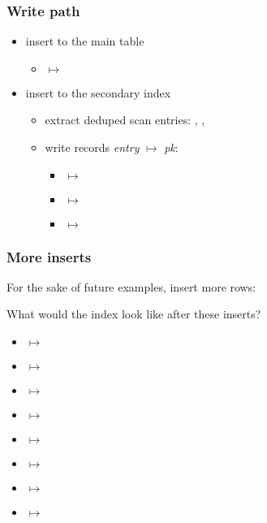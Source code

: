 \begin{frame}
  \frametitle{Write path}
  \pause

  \begin{itemize}
    \item insert to the main table
      \pause
      \begin{itemize}
        \item {} $\mapsto$ 
      \end{itemize}
      \pause
    \item insert to the secondary index
      \pause
      \begin{itemize}
        \item extract deduped scan entries: , ,
          \pause
        \item write records \emph{entry} $\mapsto$ \emph{pk}:
          \pause
          \begin{itemize}
            \item {} $\mapsto$ 
              \pause
            \item {} $\mapsto$ 
              \pause
            \item {} $\mapsto$ 
          \end{itemize}
      \end{itemize}
  \end{itemize}
\end{frame}

\begin{frame}
  \frametitle{More inserts}
  For the sake of future examples, insert more rows:

  \pause

  What would the index look like after these inserts?
  \pause

  \begin{itemize}
    \item {} $\mapsto$ 
    \item {} $\mapsto$ 
    \item {} $\mapsto$ 
    \item {} $\mapsto$ 
    \item {} $\mapsto$ 
    \item {} $\mapsto$ 
    \item {} $\mapsto$ 
    \item {} $\mapsto$ 
  \end{itemize}
\end{frame}

